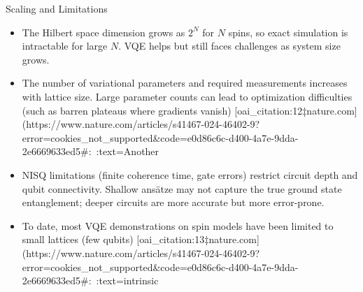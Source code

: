 \documentclass{beamer}
\begin{document}
\begin{frame}{Scaling and Limitations}
\begin{itemize}
\item The Hilbert space dimension grows as $2^N$ for $N$ spins, so exact simulation is intractable for large $N$. VQE helps but still faces challenges as system size grows.
\item The number of variational parameters and required measurements increases with lattice size. Large parameter counts can lead to optimization difficulties (such as barren plateaus where gradients vanish) [oai_citation:12‡nature.com](https://www.nature.com/articles/s41467-024-46402-9?error=cookies_not_supported&code=e0d86c6c-d400-4a7e-9dda-2e6669633ed5#:~:text=Another%
\item NISQ limitations (finite coherence time, gate errors) restrict circuit depth and qubit connectivity. Shallow ansätze may not capture the true ground state entanglement; deeper circuits are more accurate but more error-prone.
\item To date, most VQE demonstrations on spin models have been limited to small lattices (few qubits) [oai_citation:13‡nature.com](https://www.nature.com/articles/s41467-024-46402-9?error=cookies_not_supported&code=e0d86c6c-d400-4a7e-9dda-2e6669633ed5#:~:text=intrinsic%
\end{itemize}
\end{frame}
\end{document}
